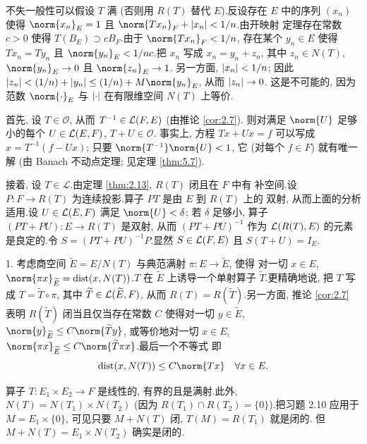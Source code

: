
不失一般性可以假设 $T$ 满 (否则用 $R(T)$ 替代 $E$).反设存在 $E$ 中的序列
$(x_n)$ 使得 $\norm{x_n}_E=1$ 且 $\norm{Tx_n}_F+\abs{x_n}<1/n$.由开映射
定理存在常数 $c>0$ 使得 $T(B_E)\supset cB_F$.由于 $\norm{Tx_n}_F<1/n$,
存在某个 $y_n\in E$ 使得 $Tx_n=Ty_n$ 且 $\norm{y_n}_E<1/nc$.把 $x_n$ 写成
$x_n=y_n+z_n$, 其中 $z_n\in N(T)$, $\norm{y_n}_E\to0$ 且 $\norm{z_n}_E\to1$.
另一方面, $\left|x_n\right|<1/n$; 因此
$\abs{z_n}<(1/n)+\abs{y_n}\le(1/n)+M\norm{y_n}_E$, 从而 $\left|z_n\right|\to0$.
这是不可能的, 因为范数 $\norm{\cdot}_E$ 与 $\left|\cdot\right|$ 在有限维空间 $N(T)$
上等价.


首先, 设 $T\in\mathcal{O}$, 从而 $T^{-1}\in\mathcal{L}(F,E)$ (由推论  \ref{cor:2.7}).
则对满足 $\norm{U}$ 足够小的每个 $U\in\mathcal{L}(E,F)$, $T+U\in\mathcal{O}$.
事实上, 方程 $Tx+Ux=f$ 可以写成 $x=T^{-1}(f-Ux)$; 只要
$\norm{T^{-1}}\norm{U}<1$, 它 (对每个 $f\in F$) 就有唯一解 (由 Banach
不动点定理; 见定理  \ref{thm:5.7}).

接着, 设 $T\in\mathcal{L}$.由定理  \ref{thm:2.13}, $R(T)$ 闭且在 $F$ 中有
补空间.设 $P:F\to R(T)$ 为连续投影.算子 $PT$ 是由 $E$ 到 $R(T)$ 上的
双射, 从而上面的分析适用.设 $U\in\mathcal{L}(E,F)$ 满足 $\norm{U}<\delta$; 若
$\delta$ 足够小, 算子 $(PT+PU):E\to R(T)$ 是双射, 从而 $(PT+PU)^{-1}$
作为 $\mathcal{L}(R(T),E)$ 的元素是良定的.令 $S=(PT+PU)^{-1}P$.显然
$S\in\mathcal{L}(F,E)$ 且 $S(T+U)=I_E$.


1. 考虑商空间 $\widetilde E=E/N(T)$ 与典范满射 $\pi:E\to\widetilde E$, 使得
对一切 $x\in E$, $\norm{\pi x}_{\widetilde E}=\dist(x,N(T))$.$T$ 在
$\widetilde E$ 上诱导一个单射算子 $\widetilde T$.更精确地说, 把 $T$ 写成
$T=\widetilde T\circ\pi$, 其中 $\widetilde T\in\mathcal{L}(\widetilde E,F)$, 从而
$R(T)=R(\widetilde T)$.另一方面, 推论  \ref{cor:2.7} 表明 $R(\widetilde T)$
闭当且仅当存在常数 $C$ 使得对一切 $y\in\widetilde E$,
$\norm{y}_{\widetilde E}\le C\norm{\widetilde Ty}$, 或等价地对一切 $x\in E$,
$\norm{\pi x}_{\widetilde E}\le C\norm{\widetilde T\pi x}$.最后一个不等式
即
\begin{equation*}
\dist(x,N(T))\le C\norm{Tx}\quad\forall x\in E.
\end{equation*}


算子 $T:E_1\times E_2\to F$ 是线性的, 有界的且是满射.此外,
$N(T)=N(T_1)\times N(T_2)$ (因为 $R(T_1)\cap R(T_2)=\{0\}$).把习题 2.10
应用于 $M=E_1\times\{0\}$, 可见只要 $M+N(T)$ 闭, $T(M)=R(T_1)$ 就是闭的.
但 $M+N(T)=E_1\times N(T_2)$ 确实是闭的.

